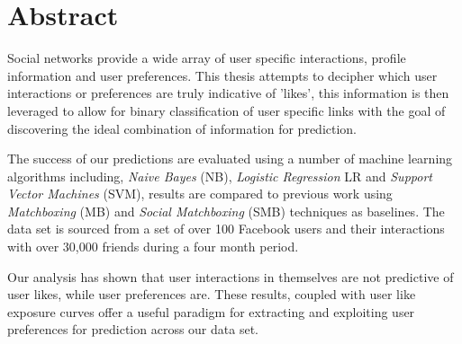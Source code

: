 
\chapter*{Abstract}
\label{cha:abstract}

Social networks provide a wide array of user specific interactions, profile information and user preferences.
This thesis attempts to decipher which user interactions or preferences are truly indicative of 'likes', this 
information is then leveraged to allow for binary classification of user specific links with the goal of discovering the 
ideal combination of information for prediction.

The success of our predictions are evaluated using a number of machine learning algorithms including, 
\emph{Naive Bayes} (NB), \emph{Logistic Regression} LR and \emph{Support Vector Machines} (SVM), results are compared to previous 
work using \emph{Matchboxing} (MB) and \emph{Social Matchboxing} (SMB) techniques as baselines. The data set is sourced from a 
set of over 100 Facebook users and their interactions with over 30,000 friends during a four month period.

Our analysis has shown that user interactions in themselves are not predictive of user likes, while user preferences are. These 
results, coupled with user like exposure curves offer a useful paradigm for extracting and exploiting user preferences for prediction 
across our data set.

